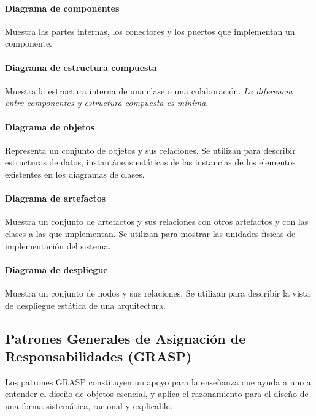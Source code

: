 \paragraph{Diagrama de componentes}
Muestra las partes internas, los conectores y los puertos que implementan un componente.
\paragraph{Diagrama de estructura compuesta}
Muestra la estructura interna de una clase o una colaboración. \emph{La diferencia entre componentes y estructura compuesta es mínima}.
\paragraph{Diagrama de objetos}
Representa un conjunto de objetos y sus relaciones. Se utilizan para describir estructuras de datos, instantáneas estáticas de las instancias de los elementos existentes en los diagramas de clases.
\paragraph{Diagrama de artefactos}
Muestra un conjunto de artefactos y sus relaciones con otros artefactos y con las clases a las que implementan. Se utilizan para mostrar las unidades físicas de implementación del sistema.
\paragraph{Diagrama de despliegue}
Muestra un conjunto de nodos y sus relaciones. Se utilizan para describir la vista de despliegue estática de una arquitectura.
\subsection{Patrones Generales de Asignación de Responsabilidades (GRASP)}
Los patrones GRASP constituyen un apoyo para la enseñanza que ayuda a uno a entender el diseño de objetos esencial, y aplica el razonamiento para el diseño de una forma sistemática, racional y explicable.
